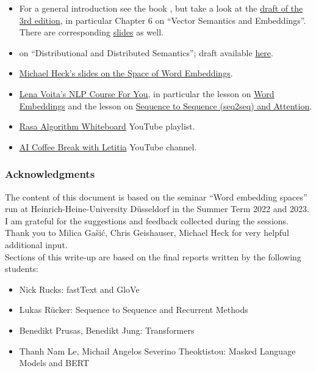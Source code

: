 \documentclass[11pt, a4paper]{amsart}
\begin{document}
\begin{itemize}
    \item For a general introduction see the book \cite{jurafsky2009speech}, but take a look at the \href{https://web.stanford.edu/~jurafsky/slp3/}{draft of the 3rd edition}, in particular Chapter 6 on ``Vector Semantics and Embeddings''.
    There are corresponding \href{https://web.stanford.edu/~jurafsky/slp3/slides/6_Vector_Apr18_2021.pdf}{slides} as well.

    \item \cite[Chp.~14]{eisenstein2019introduction} on ``Distributional and Distributed Semantics'';
    draft available \href{https://github.com/jacobeisenstein/gt-nlp-class/blob/master/notes/eisenstein-nlp-notes.pdf}{here}.

    \item \href{https://www.cs.hhu.de/fileadmin/redaktion/Fakultaeten/Mathematisch-Naturwissenschaftliche_Fakultaet/Informatik/Dialog_Systems_and_Machine_Learning/20190705_word_embeddings.pdf}{Michael Heck's slides on the Space of Word Embeddings}.
    
    \item \href{https://lena-voita.github.io/nlp_course}{Lena Voita's NLP Course For You}, in particular the lesson on \href{https://lena-voita.github.io/nlp_course/word_embeddings}{Word Embeddings} and the lesson on \href{https://lena-voita.github.io/nlp_course/seq2seq_and_attention.html}{Sequence to Sequence (seq2seq) and Attention}.
    
    \item \href{https://youtube.com/playlist?list=PL75e0qA87dlG-za8eLI6t0_Pbxafk-cxb}{Rasa Algorithm Whiteboard} YouTube playlist.
    
    \item \href{https://www.youtube.com/c/aicoffeebreak}{AI Coffee Break with Letitia} YouTube channel.
\end{itemize}

\subsubsection{Acknowledgments}

The content of this document is based on the seminar ``Word embedding spaces'' run at Heinrich-Heine-University Düsseldorf in the Summer Term 2022 and 2023.
I am grateful for the suggestions and feedback collected during the sessions. Thank you to Milica Gašić, Chris Geishauser, Michael Heck for very helpful additional input. \\
Sections of this write-up are based on the final reports written by the following students:
\begin{itemize}
	\item Nick Rucks: fastText and GloVe
	\item Lukas Rücker: Sequence to Sequence and Recurrent Methods
	\item Benedikt Prusas, Benedikt Jung: Transformers
	\item Thanh Nam Le, Michail Angelos Severino Theoktistou: Masked Language Models and BERT
\end{itemize}
\end{document}
